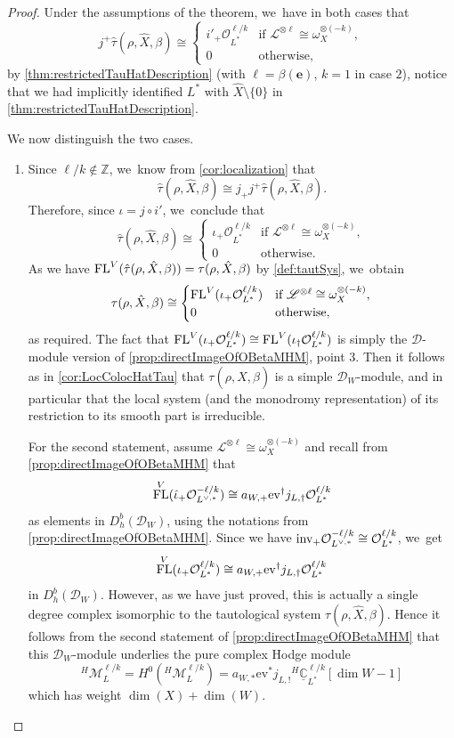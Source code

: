 \documentclass[JEP,XML,SOM,Unicode,published]{cedram}
\let\mathds\mathbb
\newcommand{\bme}{{\boldsymbol{e}}}
\newcommand{\ev}{\mathrm{ev}}
\newcommand{\dC}{{\mathds C}}\let\C\dC
\newcommand{\dZ}{{\mathds Z}}\let\mbz\dZ\let\Z\dZ
\newcommand{\cD}{\mathscr{D}}
\newcommand{\Ell}{\mathscr{L}}
\newcommand{\cM}{\mathcal{M}}
\newcommand{\cO}{\mathcal{O}}\let\O\cO
\DeclareMathOperator{\FL}{\textup{FL}}
\begin{document}
\begin{proof}
Under the assumptions of the theorem, we~have in both cases that
\[
j^+\hat\tau(\rho, \hat{X}, \beta) \cong
\begin{cases}
i'_+ \O_{L^*}^{\ell/k} &\text{if } \Ell^{\otimes \ell} \cong \omega_X^{\otimes (-k)}, \\
0 & \text{otherwise},
\end{cases}
\]
by \cref{thm:restrictedTauHatDescription} (with $\ell = \beta(\bme)$, $k = 1$ in case $2$), notice that we had implicitly identified $L^*$ with $\hat{X}\setminus \{0\}$ in \cref{thm:restrictedTauHatDescription}.

We now distinguish the two cases.
\begin{enumerate}
\item
Since
$\ell/k\notin \dZ$, we~know from
\cref{cor:localization}
that
\[
\hat{\tau}(\rho, \hat{X},\beta)\cong j_+j^+\hat{\tau}(\rho, \hat{X},\beta).
\]
Therefore, since $\iota=j\circ i'$, we~conclude that
\[
\hat{\tau}(\rho, \hat{X},\beta)\cong 
\begin{cases} \iota_+ \cO_{L^*}^{\ell/k} & \text{if } \Ell^{\otimes \ell} \cong \omega_X^{\otimes (-k)}, \\
0 &\text{otherwise}.
\end{cases}
\]
As we have $\FL^V(\hat\tau(\rho,\hat X, \beta)) = \tau(\rho,\hat X, \beta)$ by \cref{def:tautSys}, we~obtain
\[
\tau(\rho,\hat X, \beta) \cong 
\begin{cases}
\FL^V(\iota_+ \O_{L^*}^{\ell/k})
&\text{if } \Ell^{\otimes \ell} \cong \omega_X^{\otimes (-k)}, \\
0 &\text{otherwise},
\end{cases}
\]
as required. The fact that
$\FL^V(\iota_+ \O_{L^*}^{\ell/k}) \cong \FL^V(\iota_\dag \O_{L^*}^{\ell/k})$ is simply the $\cD$\nobreakdash-mod\-ule version of \cref{prop:directImageOfOBetaMHM}, point 3. Then it follows as in \cref{cor:LocColocHatTau} that $\tau(\rho,\hat{X},\beta)$ is a simple $\cD_W$\nobreakdash-mod\-ule, and in particular that the local system (and the monodromy representation) of its restriction to its smooth part is irreducible.

For the second statement, assume $\Ell^{\otimes \ell} \cong \omega_X^{\otimes (-k)}$ and recall from
\cref{prop:directImageOfOBetaMHM} that
\[
\FL^V(\hat\iota_+ \O_{L^{\vee,*}}^{-\ell/k}) \cong a_{W,+} \ev^\dag j_{L,\dag}\cO_{L^*}^{\ell/k}
\]
as elements in $D^b_h(\mathscr{D}_W)$, using the notations from \cref{prop:directImageOfOBetaMHM}. Since we have $\textup{inv}_+ \O_{L^{\vee,*}}^{-\ell/k} \cong \O_{L^*}^{\ell/k}$, we~get
\[
\FL^V(\iota_+ \O_{L^*}^{\ell/k}) \cong a_{W,+} \ev^\dag j_{L,\dag}\cO_{L^*}^{\ell/k}
\]
in $D^b_h(\mathscr D_W)$. However, as we have just proved, this is actually a single degree complex isomorphic to the tautological system $\tau(\rho,\hat X, \beta)$. Hence it follows from the second statement of \cref{prop:directImageOfOBetaMHM} that this $\mathscr{D}_W$\nobreakdash-mod\-ule underlies the pure complex Hodge module
\[
{^H\!\!}\cM_L^{\ell/k}=H^0({^H\!\!}\cM_L^{\ell/k}) =a_{W,*} \ev^* j_{L,!} {^H\!}\underline{\dC}_{L^*}^{\ell/k}[\dim W -1]
\]
which has weight $\dim(X)+\dim(W)$.


\end{enumerate}
\end{proof}
\end{document}
